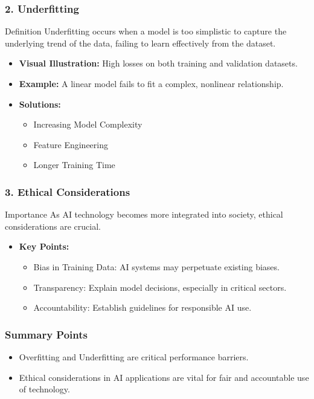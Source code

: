 \documentclass[aspectratio=169]{beamer}
\begin{document}
\begin{frame}[fragile]
    \frametitle{2. Underfitting}
    \begin{block}{Definition}
        Underfitting occurs when a model is too simplistic to capture the underlying trend of the data, failing to learn effectively from the dataset.
    \end{block}
    
    \begin{itemize}
        \item \textbf{Visual Illustration:} High losses on both training and validation datasets.
        \item \textbf{Example:} A linear model fails to fit a complex, nonlinear relationship.
        \item \textbf{Solutions:}
        \begin{itemize}
            \item Increasing Model Complexity
            \item Feature Engineering
            \item Longer Training Time
        \end{itemize}
    \end{itemize}
\end{frame}

\begin{frame}[fragile]
    \frametitle{3. Ethical Considerations}
    \begin{block}{Importance}
        As AI technology becomes more integrated into society, ethical considerations are crucial.
    \end{block}
    
    \begin{itemize}
        \item \textbf{Key Points:}
        \begin{itemize}
            \item Bias in Training Data: AI systems may perpetuate existing biases.
            \item Transparency: Explain model decisions, especially in critical sectors.
            \item Accountability: Establish guidelines for responsible AI use.
        \end{itemize}
    \end{itemize}
\end{frame}

\begin{frame}[fragile]
    \frametitle{Summary Points}
    \begin{itemize}
        \item Overfitting and Underfitting are critical performance barriers.
        \item Ethical considerations in AI applications are vital for fair and accountable use of technology.
    \end{itemize}
\end{frame}
\end{document}
